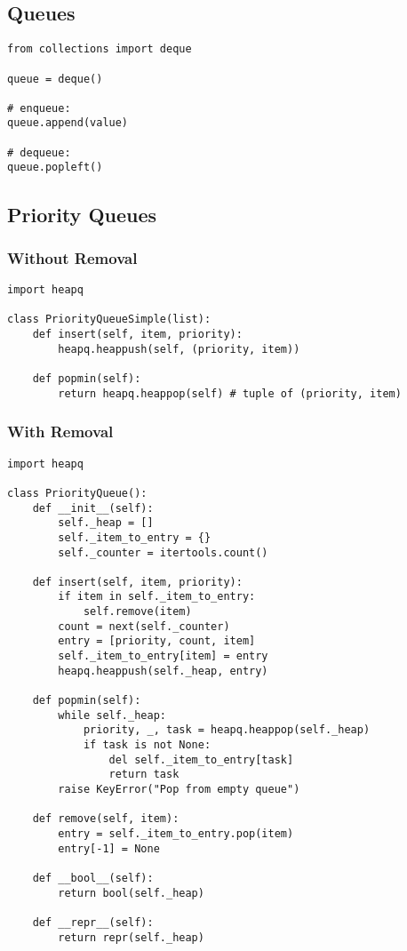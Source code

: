 \documentclass[12pt]{article}
\begin{document}
\subsection{Queues}
\begin{lstlisting}
from collections import deque

queue = deque()

# enqueue:
queue.append(value)

# dequeue:
queue.popleft()
\end{lstlisting}

\subsection{Priority Queues}
\subsubsection{Without Removal}
\begin{lstlisting}
import heapq

class PriorityQueueSimple(list):
	def insert(self, item, priority):
		heapq.heappush(self, (priority, item))

	def popmin(self):
		return heapq.heappop(self) # tuple of (priority, item)
\end{lstlisting}

\subsubsection{With Removal}
\begin{lstlisting}
import heapq

class PriorityQueue():
	def __init__(self):
		self._heap = []
		self._item_to_entry = {}
		self._counter = itertools.count()

	def insert(self, item, priority):
		if item in self._item_to_entry:
			self.remove(item)
		count = next(self._counter)
		entry = [priority, count, item]
		self._item_to_entry[item] = entry
		heapq.heappush(self._heap, entry)

	def popmin(self):
		while self._heap:
			priority, _, task = heapq.heappop(self._heap)
			if task is not None:
				del self._item_to_entry[task]
				return task
		raise KeyError("Pop from empty queue")

	def remove(self, item):
		entry = self._item_to_entry.pop(item)
		entry[-1] = None

	def __bool__(self):
		return bool(self._heap)

	def __repr__(self):
		return repr(self._heap)
\end{lstlisting}
\end{document}
